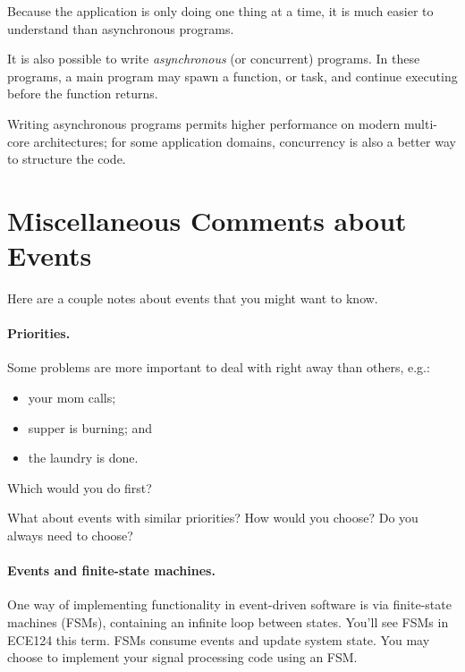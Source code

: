 Because the application is only doing one thing at a time, it is much
easier to understand than asynchronous programs.

It is also possible to write \emph{asynchronous} (or concurrent)
programs. In these programs, a main program may spawn a function, or
task, and continue executing before the function returns.

Writing asynchronous programs permits higher performance on modern
multi-core architectures; for some application domains, concurrency is
also a better way to structure the code.

\section*{Miscellaneous Comments about Events}
Here are a couple notes about events that you might want to know.

\paragraph{Priorities.} Some problems are more important to deal
with right away than others, e.g.:
\begin{itemize}
\item your mom calls; 
\item supper is burning; and
\item the laundry is done.
\end{itemize}
Which would you do first?

What about events with similar priorities? How would you choose?
Do you always need to choose?

\paragraph{Events and finite-state machines.}
One way of implementing functionality in  event-driven software is via finite-state
machines (FSMs), containing an infinite loop between states. You'll
see FSMs in ECE124 this term. FSMs consume events and update system
state. You may choose to implement your signal processing code using an FSM.




